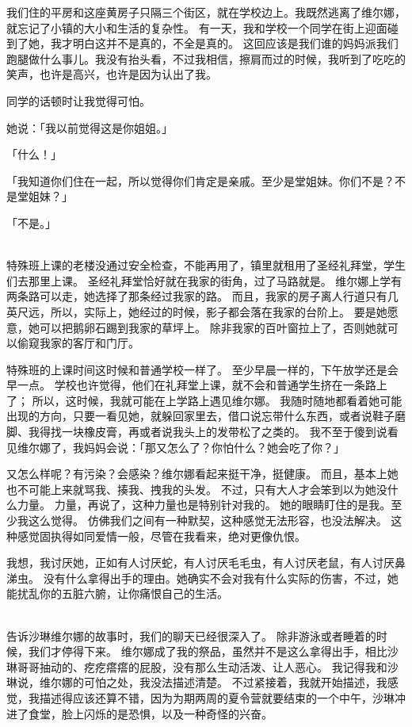 \documentclass[UTF8]{ctexart}
\begin{document}
我们住的平房和这座黄房子只隔三个街区，就在学校边上。我既然逃离了维尔娜，就忘记了小镇的大小和生活的复杂性。
有一天，我和学校一个同学在街上迎面碰到了她，我才明白这并不是真的，不全是真的。
这回应该是我们谁的妈妈派我们跑腿做什么事儿。我没有抬头看，不过我相信，擦肩而过的时候，我听到了吃吃的笑声，也许是高兴，也许是因为认出了我。

同学的话顿时让我觉得可怕。

她说：「我以前觉得这是你姐姐。」

「什么！」

「我知道你们住在一起，所以觉得你们肯定是亲戚。至少是堂姐妹。你们不是？不是堂姐妹？」

「不是。」

~\\

特殊班上课的老楼没通过安全检查，不能再用了，镇里就租用了圣经礼拜堂，学生们去那里上课。
圣经礼拜堂恰好就在我家的街角，过了马路就是。
维尔娜上学有两条路可以走，她选择了那条经过我家的路。
而且，我家的房子离人行道只有几英尺远，所以，实际上，她经过的时候，影子都会落在我家的台阶上。
要是她愿意，她可以把鹅卵石踢到我家的草坪上。
除非我家的百叶窗拉上了，否则她就可以偷窥我家的客厅和门厅。

特殊班的上课时间这时候和普通学校一样了。
至少早晨一样的，下午放学还是会早一点。
学校也许觉得，他们在礼拜堂上课，就不会和普通学生挤在一条路上了；
所以，这时候，我就可能在上学路上遇见维尔娜。
我随时随地都看着她可能出现的方向，只要一看见她，就躲回家里去，借口说忘带什么东西，或者说鞋子磨脚、我得找一块橡皮膏，再或者说我头上的发带松了之类的。
我不至于傻到说看见维尔娜了，我妈妈会说：「那又怎么了？你怕什么？她会吃了你？」

又怎么样呢？有污染？会感染？维尔娜看起来挺干净，挺健康。
而且，基本上她也不可能上来就骂我、揍我、拽我的头发。
不过，只有大人才会笨到以为她没什么力量。
力量，再说了，这种力量也是特别针对我的。
她的眼睛盯住的是我。至少我这么觉得。
仿佛我们之间有一种默契，这种感觉无法形容，也没法解决。
这种感觉固执得如同爱情一般，尽管在我看来，绝对更像仇恨。

我想，我讨厌她，正如有人讨厌蛇，有人讨厌毛毛虫，有人讨厌老鼠，有人讨厌鼻涕虫。
没有什么拿得出手的理由。她确实不会对我有什么实际的伤害，不过，她能扰乱你的五脏六腑，让你痛恨自己的生活。

~\\


告诉沙琳维尔娜的故事时，我们的聊天已经很深入了。
除非游泳或者睡着的时候，我们才停得下来。
维尔娜成了我的祭品，虽然并不是这么拿得出手，相比沙琳哥哥抽动的、疙疙瘩瘩的屁股，没有那么生动活泼、让人恶心。
我记得我和沙琳说，维尔娜的可怕之处，我没法描述清楚。
不过紧接着，我就开始描述，我感觉，我描述得应该还算不错，因为为期两周的夏令营就要结束的一个中午，沙琳冲进了食堂，脸上闪烁的是恐惧，以及一种奇怪的兴奋。
\end{document}
